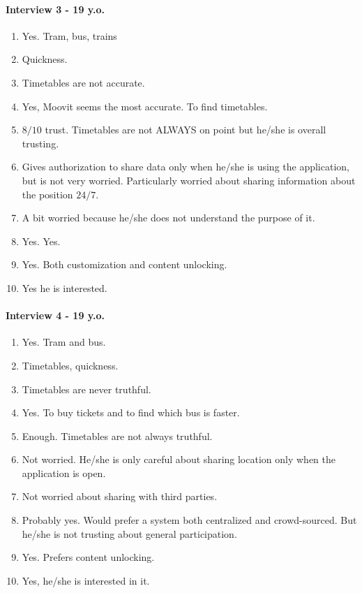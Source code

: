 \documentclass[a4paper, 10pt]{IEEEtran}
\begin{document}
\paragraph*{Interview 3 - 19 y.o.}
\begin{enumerate}
    \item Yes. Tram, bus, trains
    \item Quickness.
    \item Timetables are not accurate.
    \item Yes, Moovit seems the most accurate. To find timetables.
    \item $8/10$ trust. Timetables are not ALWAYS on point but he/she is overall trusting.
    \item Gives authorization to share data only when he/she is using the application, but is not very worried. Particularly worried about sharing information about the position $24/7$.
    \item A bit worried because he/she does not understand the purpose of it.
    \item Yes. Yes.
    \item Yes. Both customization and content unlocking.
    \item Yes he is interested.
\end{enumerate}

\paragraph*{Interview 4 - 19 y.o.}
\begin{enumerate}
    \item Yes. Tram and bus.
    \item Timetables, quickness.
    \item Timetables are never truthful.
    \item Yes. To buy tickets and to find which bus is faster.
    \item Enough. Timetables are not always truthful.
    \item Not worried. He/she is only careful about sharing location only when the application is open.
    \item Not worried about sharing with third parties.
    \item Probably yes. Would prefer a system both centralized and crowd-sourced. But he/she is not trusting about general participation.
    \item Yes. Prefers content unlocking.
    \item Yes, he/she is interested in it.
\end{enumerate}
\end{document}
